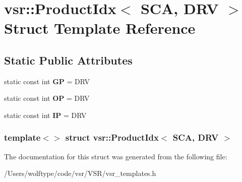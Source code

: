 \hypertarget{structvsr_1_1_product_idx_3_01_s_c_a_00_01_d_r_v_01_4}{\section{vsr\-:\-:Product\-Idx$<$ S\-C\-A, D\-R\-V $>$ Struct Template Reference}
\label{structvsr_1_1_product_idx_3_01_s_c_a_00_01_d_r_v_01_4}
}
\subsection*{Static Public Attributes}
\begin{DoxyCompactItemize}
\item 
\hypertarget{structvsr_1_1_product_idx_3_01_s_c_a_00_01_d_r_v_01_4_a9173ff1445815ef1ed00ef3cf66004a8}{static const int {\bfseries G\-P} = D\-R\-V}\label{structvsr_1_1_product_idx_3_01_s_c_a_00_01_d_r_v_01_4_a9173ff1445815ef1ed00ef3cf66004a8}

\item 
\hypertarget{structvsr_1_1_product_idx_3_01_s_c_a_00_01_d_r_v_01_4_a3d532b3e4ced526299999278956faef2}{static const int {\bfseries O\-P} = D\-R\-V}\label{structvsr_1_1_product_idx_3_01_s_c_a_00_01_d_r_v_01_4_a3d532b3e4ced526299999278956faef2}

\item 
\hypertarget{structvsr_1_1_product_idx_3_01_s_c_a_00_01_d_r_v_01_4_ae1e7115e993e7309607f55d191c900a3}{static const int {\bfseries I\-P} = D\-R\-V}\label{structvsr_1_1_product_idx_3_01_s_c_a_00_01_d_r_v_01_4_ae1e7115e993e7309607f55d191c900a3}

\end{DoxyCompactItemize}
\subsubsection*{template$<$$>$ struct vsr\-::\-Product\-Idx$<$ S\-C\-A, D\-R\-V $>$}



The documentation for this struct was generated from the following file\-:\begin{DoxyCompactItemize}
\item 
/\-Users/wolftype/code/vsr/\-V\-S\-R/vsr\-\_\-templates.\-h\end{DoxyCompactItemize}
